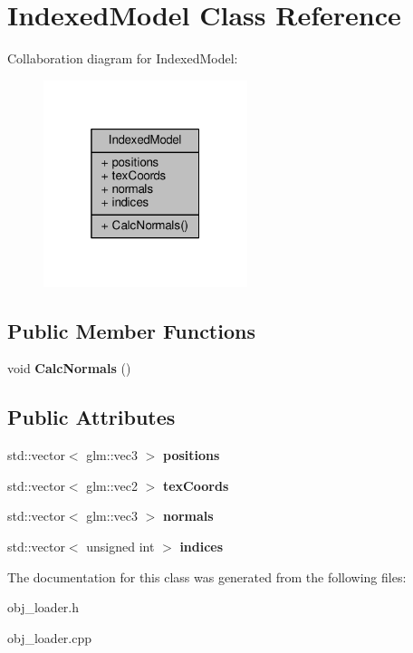\hypertarget{class_indexed_model}{}\section{Indexed\+Model Class Reference}
\label{class_indexed_model}


Collaboration diagram for Indexed\+Model\+:\nopagebreak
\begin{figure}[H]
\begin{center}
\leavevmode
\includegraphics[width=169pt]{class_indexed_model__coll__graph}
\end{center}
\end{figure}
\subsection*{Public Member Functions}
\begin{DoxyCompactItemize}
\item 
void {\bfseries Calc\+Normals} ()\hypertarget{class_indexed_model_ad7c6f8680a079108e64d463b34dca802}{}\label{class_indexed_model_ad7c6f8680a079108e64d463b34dca802}

\end{DoxyCompactItemize}
\subsection*{Public Attributes}
\begin{DoxyCompactItemize}
\item 
std\+::vector$<$ glm\+::vec3 $>$ {\bfseries positions}\hypertarget{class_indexed_model_a81d6b9180bd152add38881ed6def521a}{}\label{class_indexed_model_a81d6b9180bd152add38881ed6def521a}

\item 
std\+::vector$<$ glm\+::vec2 $>$ {\bfseries tex\+Coords}\hypertarget{class_indexed_model_a8b7d3dd202865fb909f6cc07080f0f8d}{}\label{class_indexed_model_a8b7d3dd202865fb909f6cc07080f0f8d}

\item 
std\+::vector$<$ glm\+::vec3 $>$ {\bfseries normals}\hypertarget{class_indexed_model_a43a9aa25e0461c1a729693fd7efaf45f}{}\label{class_indexed_model_a43a9aa25e0461c1a729693fd7efaf45f}

\item 
std\+::vector$<$ unsigned int $>$ {\bfseries indices}\hypertarget{class_indexed_model_ae9ab23aa197180acd72e017503dd6a34}{}\label{class_indexed_model_ae9ab23aa197180acd72e017503dd6a34}

\end{DoxyCompactItemize}


The documentation for this class was generated from the following files\+:\begin{DoxyCompactItemize}
\item 
obj\+\_\+loader.\+h\item 
obj\+\_\+loader.\+cpp\end{DoxyCompactItemize}

